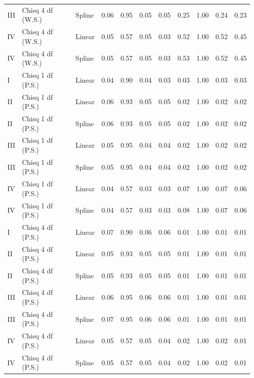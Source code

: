 \documentclass{article}\usepackage[]{graphicx}\usepackage[]{color}
\begin{document}
\begin{table}[ht]
\begin{tabular}{lll|llll|llll}
  III & Chisq 4 df (W.S.) & Spline & 0.06 & 0.95 & 0.05 & 0.05 & 0.25 & 1.00 & 0.24 & 0.23 \\ 
  IV & Chisq 4 df (W.S.) & Linear & 0.05 & 0.57 & 0.05 & 0.03 & 0.52 & 1.00 & 0.52 & 0.45 \\ 
  IV & Chisq 4 df (W.S.) & Spline & 0.05 & 0.57 & 0.05 & 0.03 & 0.53 & 1.00 & 0.52 & 0.45 \\ 
   \hline
I & Chisq 1 df (P.S.) & Linear & 0.04 & 0.90 & 0.04 & 0.03 & 0.03 & 1.00 & 0.03 & 0.03 \\ 
  II & Chisq 1 df (P.S.) & Linear & 0.06 & 0.93 & 0.05 & 0.05 & 0.02 & 1.00 & 0.02 & 0.02 \\ 
  II & Chisq 1 df (P.S.) & Spline & 0.06 & 0.93 & 0.05 & 0.05 & 0.02 & 1.00 & 0.02 & 0.02 \\ 
  III & Chisq 1 df (P.S.) & Linear & 0.05 & 0.95 & 0.04 & 0.04 & 0.02 & 1.00 & 0.02 & 0.02 \\ 
  III & Chisq 1 df (P.S.) & Spline & 0.05 & 0.95 & 0.04 & 0.04 & 0.02 & 1.00 & 0.02 & 0.02 \\ 
  IV & Chisq 1 df (P.S.) & Linear & 0.04 & 0.57 & 0.03 & 0.03 & 0.07 & 1.00 & 0.07 & 0.06 \\ 
  IV & Chisq 1 df (P.S.) & Spline & 0.04 & 0.57 & 0.03 & 0.03 & 0.08 & 1.00 & 0.07 & 0.06 \\ 
   \hline
I & Chisq 4 df (P.S.) & Linear & 0.07 & 0.90 & 0.06 & 0.06 & 0.01 & 1.00 & 0.01 & 0.01 \\ 
  II & Chisq 4 df (P.S.) & Linear & 0.05 & 0.93 & 0.05 & 0.05 & 0.01 & 1.00 & 0.01 & 0.01 \\ 
  II & Chisq 4 df (P.S.) & Spline & 0.05 & 0.93 & 0.05 & 0.05 & 0.01 & 1.00 & 0.01 & 0.01 \\ 
  III & Chisq 4 df (P.S.) & Linear & 0.06 & 0.95 & 0.06 & 0.06 & 0.01 & 1.00 & 0.01 & 0.01 \\ 
  III & Chisq 4 df (P.S.) & Spline & 0.07 & 0.95 & 0.06 & 0.06 & 0.01 & 1.00 & 0.01 & 0.01 \\ 
  IV & Chisq 4 df (P.S.) & Linear & 0.05 & 0.57 & 0.05 & 0.04 & 0.02 & 1.00 & 0.02 & 0.01 \\ 
  IV & Chisq 4 df (P.S.) & Spline & 0.05 & 0.57 & 0.05 & 0.04 & 0.02 & 1.00 & 0.02 & 0.01 \\ 
   \hline
\end{tabular}
\end{table}
\end{document}

